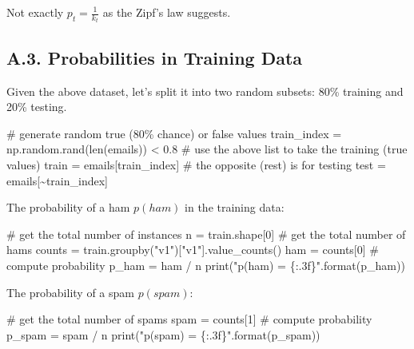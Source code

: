 \documentclass[
  letterpaper,
]{scrbook}
\newenvironment{Shaded}{\begin{snugshade}}{\end{snugshade}}
\newcommand{\BuiltInTok}[1]{\textcolor[rgb]{0.00,0.23,0.31}{#1}}
\newcommand{\CommentTok}[1]{\textcolor[rgb]{0.37,0.37,0.37}{#1}}
\newcommand{\DecValTok}[1]{\textcolor[rgb]{0.68,0.00,0.00}{#1}}
\newcommand{\FloatTok}[1]{\textcolor[rgb]{0.68,0.00,0.00}{#1}}
\newcommand{\NormalTok}[1]{\textcolor[rgb]{0.00,0.23,0.31}{#1}}
\newcommand{\OperatorTok}[1]{\textcolor[rgb]{0.37,0.37,0.37}{#1}}
\newcommand{\SpecialCharTok}[1]{\textcolor[rgb]{0.37,0.37,0.37}{#1}}
\newcommand{\StringTok}[1]{\textcolor[rgb]{0.13,0.47,0.30}{#1}}
\begin{document}
Not exactly \(p_t = \frac{1}{k_t}\) as the Zipf's law suggests.

\subsection*{A.3. Probabilities in Training
Data}\label{a.3.-probabilities-in-training-data}

Given the above dataset, let's split it into two random subsets: 80\%
training and 20\% testing.

\begin{Shaded}
\begin{Highlighting}[]
\CommentTok{\# generate random true (80\% chance) or false values}
\NormalTok{train\_index }\OperatorTok{=}\NormalTok{ np.random.rand(}\BuiltInTok{len}\NormalTok{(emails)) }\OperatorTok{\textless{}} \FloatTok{0.8}
\CommentTok{\# use the above list to take the training (true values)}
\NormalTok{train }\OperatorTok{=}\NormalTok{ emails[train\_index]}
\CommentTok{\# the opposite (rest) is for testing}
\NormalTok{test }\OperatorTok{=}\NormalTok{ emails[}\OperatorTok{\textasciitilde{}}\NormalTok{train\_index]}
\end{Highlighting}
\end{Shaded}

The probability of a ham \(p(ham)\) in the training data:

\begin{Shaded}
\begin{Highlighting}[]
\CommentTok{\# get the total number of instances}
\NormalTok{n }\OperatorTok{=}\NormalTok{ train.shape[}\DecValTok{0}\NormalTok{]}
\CommentTok{\# get the total number of hams}
\NormalTok{counts }\OperatorTok{=}\NormalTok{ train.groupby(}\StringTok{"v1"}\NormalTok{)[}\StringTok{"v1"}\NormalTok{].value\_counts()}
\NormalTok{ham }\OperatorTok{=}\NormalTok{ counts[}\DecValTok{0}\NormalTok{]}
\CommentTok{\# compute probability}
\NormalTok{p\_ham }\OperatorTok{=}\NormalTok{ ham }\OperatorTok{/}\NormalTok{ n}
\BuiltInTok{print}\NormalTok{(}\StringTok{"p(ham) = }\SpecialCharTok{\{:.3f\}}\StringTok{"}\NormalTok{.}\BuiltInTok{format}\NormalTok{(p\_ham))}
\end{Highlighting}
\end{Shaded}

The probability of a spam \(p(spam)\):

\begin{Shaded}
\begin{Highlighting}[]
\CommentTok{\# get the total number of spams}
\NormalTok{spam }\OperatorTok{=}\NormalTok{ counts[}\DecValTok{1}\NormalTok{]}
\CommentTok{\# compute probability}
\NormalTok{p\_spam }\OperatorTok{=}\NormalTok{ spam }\OperatorTok{/}\NormalTok{ n}
\BuiltInTok{print}\NormalTok{(}\StringTok{"p(spam) = }\SpecialCharTok{\{:.3f\}}\StringTok{"}\NormalTok{.}\BuiltInTok{format}\NormalTok{(p\_spam))}
\end{Highlighting}
\end{Shaded}
\end{document}
